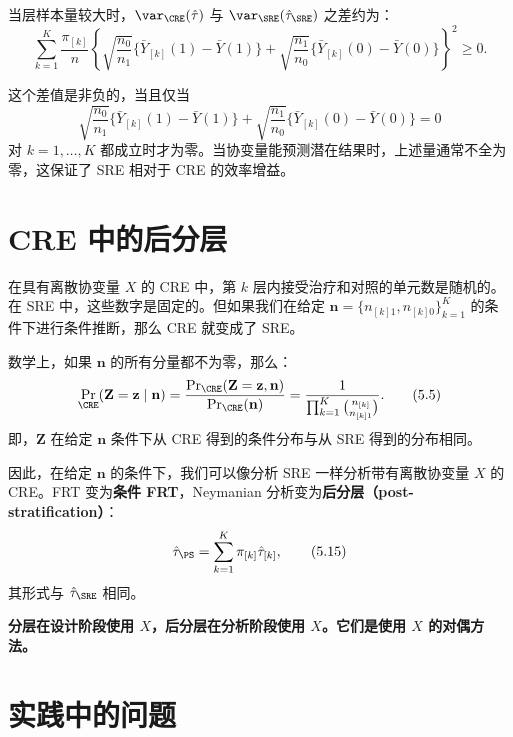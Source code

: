 当层样本量较大时，$\var_{\CRE}(\hat\tau)$ 与 $\var_{\SRE}(\hat\tau_\SRE)$ 之差约为：
\[
\sum_{k=1}^K \frac{\pi_{[k]}}{n} \left\{ \sqrt{\frac{n_0}{n_1}} \{\bar Y_{[k]}(1) - \bar Y(1)\} + \sqrt{\frac{n_1}{n_0}} \{\bar Y_{[k]}(0) - \bar Y(0)\} \right\}^2 \geq 0.
\label{eq:5-4-difference}
\tag{5.4}
\]

这个差值是非负的，当且仅当
\[
\sqrt{\frac{n_0}{n_1}} \{\bar Y_{[k]}(1) - \bar Y(1)\} + \sqrt{\frac{n_1}{n_0}} \{\bar Y_{[k]}(0) - \bar Y(0)\} = 0
\]
对 $k = 1, \dots, K$ 都成立时才为零。当协变量能预测潜在结果时，上述量通常不全为零，这保证了 SRE 相对于 CRE 的效率增益。

\par{}

\section{CRE 中的后分层}\label{sec:5-post-stratification}

在具有离散协变量 $X$ 的 CRE 中，第 $k$ 层内接受治疗和对照的单元数是随机的。在 SRE 中，这些数字是固定的。但如果我们在给定 $\mathbf{n} = \{n_{[k]1}, n_{[k]0}\}_{k=1}^K$ 的条件下进行条件推断，那么 CRE 就变成了 SRE。

数学上，如果 $\mathbf{n}$ 的所有分量都不为零，那么：
\[
\Pr_{\CRE}(\mathbf{Z} = \mathbf{z} \mid \mathbf{n}) = \frac{\Pr_{\CRE}(\mathbf{Z} = \mathbf{z}, \mathbf{n})}{\Pr_{\CRE}(\mathbf{n})} = \frac{1}{\prod_{k=1}^K \binom{n_{[k]}}{n_{[k]1}}}.
\label{eq:5-5-condition}
\tag{5.5}
\]
即，$\mathbf{Z}$ 在给定 $\mathbf{n}$ 条件下从 CRE 得到的条件分布与从 SRE 得到的分布相同。

因此，在给定 $\mathbf{n}$ 的条件下，我们可以像分析 SRE 一样分析带有离散协变量 $X$ 的 CRE。FRT 变为\textbf{条件 FRT}，Neymanian 分析变为\textbf{后分层（post-stratification）}：
\[
\hat\tau_\PS = \sum_{k=1}^K \pi_{[k]} \hat\tau_{[k]},
\tag{5.15}
\]
其形式与 $\hat\tau_\SRE$ 相同。

\textbf{分层在设计阶段使用 $X$，后分层在分析阶段使用 $X$。它们是使用 $X$ 的对偶方法。}

\par{}

\section{实践中的问题}\label{sec:5-practice}

